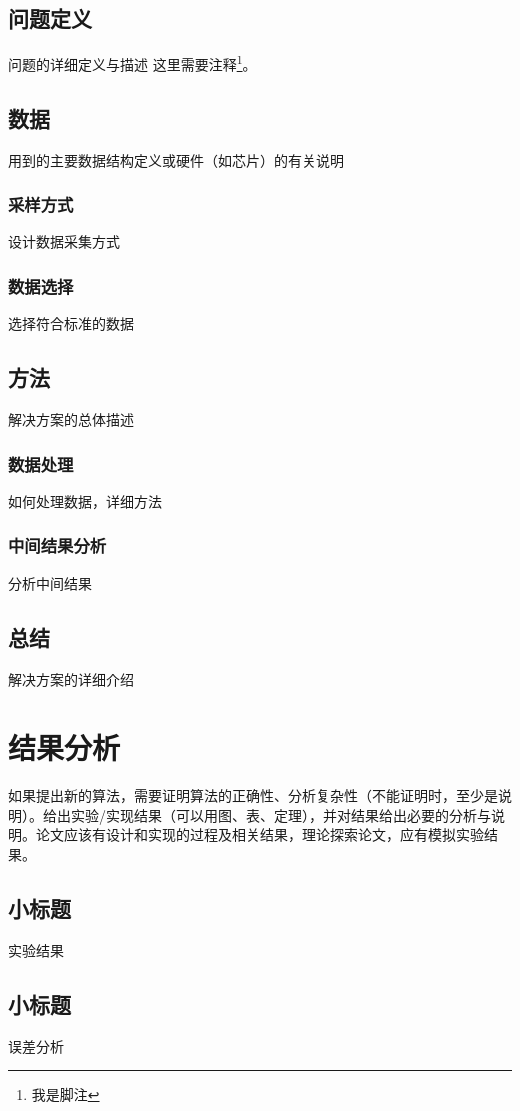 \documentclass[a4paper,fancyhdr,fntef,UTF8,hyperref,openany,oneside,notitlepage]{book}%
\begin{document}
\section{问题定义}
问题的详细定义与描述
这里需要注释\footnote{我是脚注}。
\section{数据}
用到的主要数据结构定义或硬件（如芯片）的有关说明

\subsection{采样方式}
设计数据采集方式
\subsection{数据选择}
选择符合标准的数据

\section{方法}
解决方案的总体描述

\subsection{数据处理}
如何处理数据，详细方法

\subsection{中间结果分析}
分析中间结果

\section{总结}
解决方案的详细介绍


\chapter{结果分析}
如果提出新的算法，需要证明算法的正确性、分析复杂性（不能证明时，至少是说明）。给出实验/实现结果（可以用图、表、定理），并对结果给出必要的分析与说明。论文应该有设计和实现的过程及相关结果，理论探索论文，应有模拟实验结果。
\section{小标题}
实验结果
\section{小标题}
误差分析
\end{document}
